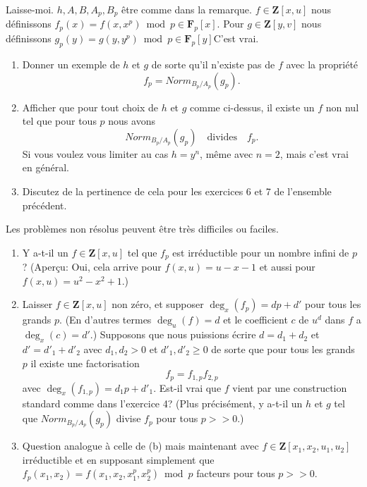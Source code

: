 \begin{exercise}
\label{exercise-strange-fp-3}
Laisse-moi. $h, A, B, A_p, B_p$ être comme dans la remarque. $f \in {\mathbf Z}[x, u]$
nous définissons $f_p(x) = f(x, x^p) \bmod p \in {\mathbf F}_p[x]$. Pour
$g \in {\mathbf Z}[y, v]$ nous définissons
$g_p(y) = g(y, y^p) \bmod p \in {\mathbf F}_p[y]$C'est vrai.
\begin{enumerate}
\item Donner un exemple de $h$ et $g$ de
sorte qu'il n'existe pas de $f$ avec la propriété
$$
f_p  =  Norm_{B_p/A_p}(g_p).
$$
\item Afficher que pour tout choix de $h$ et $g$ comme ci-dessus,
il existe un $f$ non nul tel que pour tous $p$ nous avons
$$
Norm_{B_p/A_p}(g_p)\quad\text{divides}\quad f_p .
$$
Si vous voulez vous limiter au cas $h = y^n$, même avec $n = 2$,
mais c'est vrai en général.
\item Discutez de la pertinence de cela pour les exercices 6 et 7 de l'ensemble
précédent.
\end{enumerate}
\end{exercise}

\begin{exercise}
\label{exercise-strange-fp-unsolved}
Les problèmes non résolus peuvent être très difficiles
ou faciles.
\begin{enumerate}
\item Y a-t-il un $f \in {\mathbf Z}[x, u]$ tel que $f_p$ est irréductible
pour un nombre infini de $p$? (Aperçu: Oui, cela arrive pour $f(x, u) = u -
x - 1$ et aussi pour $f(x, u) = u^2 - x^2 + 1$.)
\item Laisser $f \in {\mathbf Z}[x, u]$ non zéro, et supposer $\deg_x(f_p)
= dp + d'$ pour tous les grands $p$. (En d'autres termes $\deg_u(f) = d$ et
le coefficient $c$ de $u^d$ dans $f$ a $\deg_x(c) = d'$.) Supposons que nous puissions
écrire $d = d_1 + d_2$ et $d' = d'_1 + d'_2$ avec $d_1,
d_2 > 0$ et $d'_1, d'_2 \geq 0$ de sorte que pour tous les
grands $p$ il existe une factorisation
$$
f_p = f_{1, p} f_{2, p}
$$
avec $\deg_x(f_{1, p}) = d_1p + d'_1$. Est-il vrai que $f$ vient par
une construction standard comme dans l'exercice 4? (Plus précisément, y a-t-il un $h$
et $g$ tel que $Norm_{B_p/A_p}(g_p)$ divise $f_p$ pour tous $p >> 0$.)
\item Question analogue à celle de (b) mais maintenant avec
$f \in {\mathbf Z}[x_1, x_2, u_1, u_2]$ irréductible et en supposant simplement que $f_p(x_1,
x_2) = f(x_1, x_2, x_1^p, x_2^p) \bmod p$ facteurs pour tous $p
>> 0$.
\end{enumerate}
\end{exercise}


















